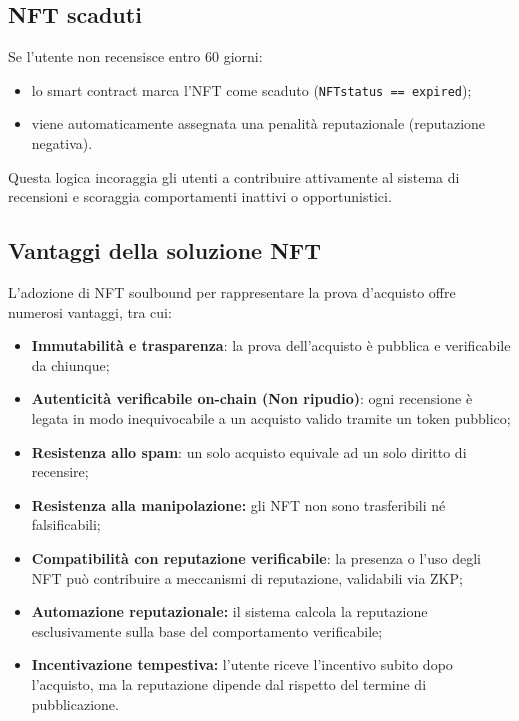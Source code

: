         \subsection{NFT scaduti}
            Se l'utente non recensisce entro 60 giorni:
                \begin{itemize}
                    \item lo smart contract marca l’NFT come scaduto (\texttt{NFTstatus == expired});
                    \item viene automaticamente assegnata una penalità reputazionale (reputazione negativa).
                \end{itemize}
        
            \noindent Questa logica incoraggia gli utenti a contribuire attivamente al sistema di recensioni e scoraggia comportamenti inattivi o opportunistici.

        \subsection{Vantaggi della soluzione NFT}
            L'adozione di NFT soulbound per rappresentare la prova d'acquisto offre numerosi vantaggi, tra cui:
            \begin{itemize}
                    \item \textbf{Immutabilità e trasparenza}: la prova dell'acquisto è pubblica e verificabile da chiunque;
                    
                    \item \textbf{Autenticità verificabile on-chain (Non ripudio)}: ogni recensione è legata in modo inequivocabile a un acquisto valido tramite un token pubblico;
                    
                    \item \textbf{Resistenza allo spam}: un solo acquisto equivale ad un solo diritto di recensire;

                    \item \textbf{Resistenza alla manipolazione:} gli NFT non sono trasferibili né falsificabili;
                    
                    \item \textbf{Compatibilità con reputazione verificabile}: la presenza o l'uso degli NFT può contribuire a meccanismi di reputazione, validabili via ZKP;

                    \item \textbf{Automazione reputazionale:} il sistema calcola la reputazione esclusivamente sulla base del comportamento verificabile;
    
                    \item \textbf{Incentivazione tempestiva:} l'utente riceve l'incentivo subito dopo l'acquisto, ma la reputazione dipende dal rispetto del termine di pubblicazione.
                \end{itemize}
        
